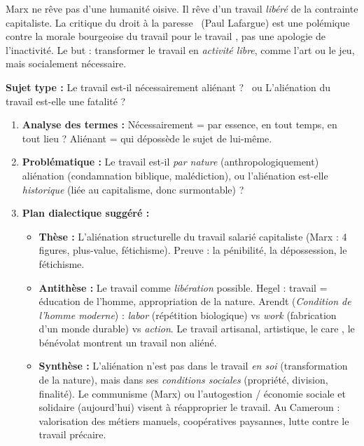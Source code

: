 \documentclass[11pt]{article}
\begin{document}
\begin{attention}
Marx ne rêve pas d'une humanité oisive. Il rêve d'un travail \emph{libéré} de la contrainte capitaliste. La critique du \guillemotleft droit à la paresse \guillemotright\ (Paul Lafargue) est une polémique contre la morale bourgeoise du \guillemotleft travail pour le travail \guillemotright, pas une apologie de l'inactivité. Le but : transformer le travail en \emph{activité libre}, comme l'art ou le jeu, mais socialement nécessaire.
\end{attention}

\begin{methode}
\textbf{Sujet type :} \guillemotleft Le travail est-il nécessairement aliénant ? \guillemotright\ ou \guillemotleft L'aliénation du travail est-elle une fatalité ? \guillemotright

\begin{enumerate}
    \item \textbf{Analyse des termes :} \guillemotleft Nécessairement \guillemotright = par essence, en tout temps, en tout lieu ? \guillemotleft Aliénant \guillemotright = qui dépossède le sujet de lui-même.
    \item \textbf{Problématique :} Le travail est-il \emph{par nature} (anthropologiquement) aliénation (condamnation biblique, malédiction), ou l'aliénation est-elle \emph{historique} (liée au capitalisme, donc surmontable) ?
    \item \textbf{Plan dialectique suggéré :}
    \begin{itemize}
        \item \textbf{Thèse :} L'aliénation structurelle du travail salarié capitaliste (Marx : 4 figures, plus-value, fétichisme). Preuve : la pénibilité, la dépossession, le fétichisme.
        \item \textbf{Antithèse :} Le travail comme \emph{libération} possible. Hegel : travail = éducation de l'homme, appropriation de la nature. Arendt (\emph{Condition de l'homme moderne}) : \emph{labor} (répétition biologique) vs \emph{work} (fabrication d'un monde durable) vs \emph{action}. Le travail artisanal, artistique, le \guillemotleft care \guillemotright, le bénévolat montrent un travail non aliéné.
        \item \textbf{Synthèse :} L'aliénation n'est pas dans le travail \emph{en soi} (transformation de la nature), mais dans ses \emph{conditions sociales} (propriété, division, finalité). Le communisme (Marx) ou l'autogestion / économie sociale et solidaire (aujourd'hui) visent à réapproprier le travail. Au Cameroun : valorisation des métiers manuels, coopératives paysannes, lutte contre le travail précaire.
    \end{itemize}
\end{enumerate}
\end{methode}
\end{document}
